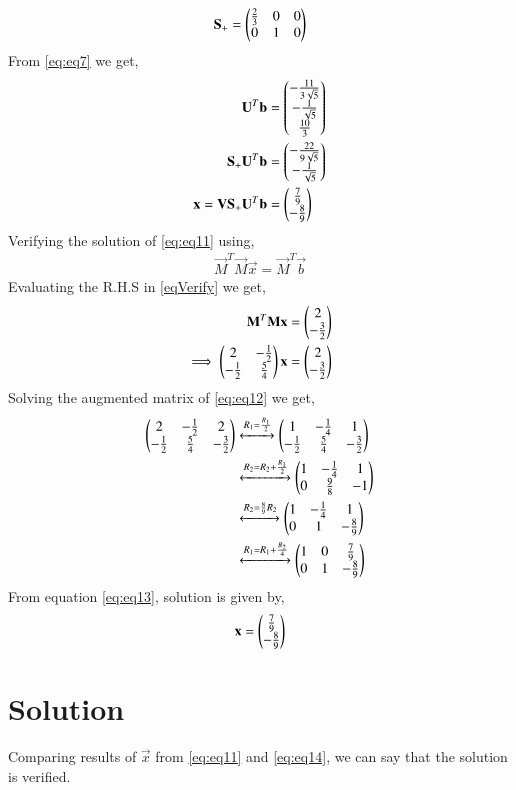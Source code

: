 \documentclass[journal,12pt,twocolumn]{IEEEtran}
\begin{document}
\begin{align}
\mathbf{S_+} = \begin{pmatrix}\frac{2}{3}&0&0\\0&1&0\end{pmatrix}
\end{align}
From \eqref{eq:eq7} we get,
\begin{align}
\mathbf{U}^T\mathbf{b}&=\begin{pmatrix}-\frac{11}{3\sqrt{5}}\\-\frac{1}{\sqrt{5}}\\\frac{10}{3}\end{pmatrix}\\
\mathbf{S_+}\mathbf{U}^T\mathbf{b}&=\begin{pmatrix}-\frac{22}{9\sqrt{5}}\\-\frac{1}{\sqrt{5}}\end{pmatrix}\\
\mathbf{x} = \mathbf{V}\mathbf{S_+}\mathbf{U}^T\mathbf{b} &= \begin{pmatrix}\frac{7}{9}\\-\frac{8}{9}\end{pmatrix} \label{eq:eq11}
\end{align}
Verifying the solution of \eqref{eq:eq11} using,
\begin{align}
\vec{M}^T\vec{M}\vec{x} = \vec{M}^T\vec{b}\label{eqVerify}
\end{align}
Evaluating the R.H.S in \eqref{eqVerify} we get,
\begin{align}
\mathbf{M}^T\mathbf{M}\mathbf{x} &= \begin{pmatrix}2\\-\frac{3}{2}\end{pmatrix}\\
\implies\begin{pmatrix}2&-\frac{1}{2}\\-\frac{1}{2}&\frac{5}{4}\end{pmatrix}\mathbf{x} &= \begin{pmatrix}2\\-\frac{3}{2}\end{pmatrix}\label{eq:eq12}
\end{align}
Solving the augmented matrix of \eqref{eq:eq12} we get,
\begin{align}
\begin{pmatrix}2&-\frac{1}{2}&2\\-\frac{1}{2}&\frac{5}{4}&-\frac{3}{2}\end{pmatrix} &\xleftrightarrow{R_1=\frac{R_1}{2}}\begin{pmatrix}1&-\frac{1}{4}&1\\-\frac{1}{2}&\frac{5}{4}&-\frac{3}{2}\end{pmatrix}\\
&\xleftrightarrow{R_2=R_2+\frac{R_1}{2}}\begin{pmatrix}1&-\frac{1}{4}&1\\0&\frac{9}{8}&-1\end{pmatrix}\\
&\xleftrightarrow{R_2=\frac{8}{9}R_2}\begin{pmatrix}1&-\frac{1}{4}&1\\0&1&-\frac{8}{9}\end{pmatrix}\\
&\xleftrightarrow{R_1=R_1+\frac{R_2}{4}}\begin{pmatrix}1&0&\frac{7}{9}\\0&1&-\frac{8}{9}\end{pmatrix}\label{eq:eq13}
\end{align}
From equation \eqref{eq:eq13}, solution is given by,
\begin{align}
\mathbf{x}=\begin{pmatrix}\frac{7}{9}\\-\frac{8}{9}\end{pmatrix}\label{eq:eq14}
\end{align}
\section{Solution}
Comparing results of $\vec{x}$ from \eqref{eq:eq11} and \eqref{eq:eq14}, we can say that the solution is verified.
\\
\end{document}

